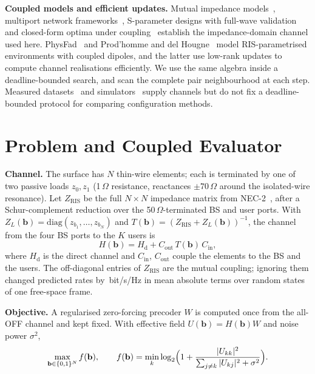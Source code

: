 \documentclass[runningheads]{llncs}
\newcommand{\Hd}{H_{\mathrm{d}}}
\begin{document}
\textbf{Coupled models and efficient updates.} Mutual impedance models~\cite{qian2020mutual}, multiport network frameworks~\cite{nerini2024universal,nossek2024physically}, S-parameter designs with full-wave validation~\cite{abrardo2024design} and closed-form optima under coupling~\cite{nerini2026global} establish the impedance-domain channel used here. PhysFad~\cite{faqiri2023physfad} and Prod'homme and del Hougne~\cite{prodhomme2023efficient} model RIS-parametrised environments with coupled dipoles, and the latter use low-rank updates to compute channel realisations efficiently. We use the same algebra inside a deadline-bounded search, and scan the complete pair neighbourhood at each step. Measured datasets~\cite{tewes2023comprehensive,rossanese2024open,piana2026brisc} and simulators~\cite{burtakov2023qris} supply channels but do not fix a deadline-bounded protocol for comparing configuration methods.

\section{Problem and Coupled Evaluator}\label{sec:problem}
\textbf{Channel.} The surface has $N$ thin-wire elements; each is terminated by one of two passive loads $z_0,z_1$ (1\,$\Omega$ resistance, reactances $\pm70\,\Omega$ around the isolated-wire resonance). Let $Z_{\mathrm{RIS}}$ be the full $N\times N$ impedance matrix from NEC-2~\cite{burke1981nec,pynec}, after a Schur-complement reduction over the 50\,$\Omega$-terminated BS and user ports. With $Z_L(\mathbf b)=\mathrm{diag}(z_{b_1},\dots,z_{b_N})$ and $T(\mathbf b)=(Z_{\mathrm{RIS}}+Z_L(\mathbf b))^{-1}$, the channel from the four BS ports to the $K$ users is
\begin{equation}
H(\mathbf b)=\Hd + C_{\mathrm{out}}\,T(\mathbf b)\,C_{\mathrm{in}},
\label{eq:operator}
\end{equation}
where $\Hd$ is the direct channel and $C_{\mathrm{in}}$, $C_{\mathrm{out}}$ couple the elements to the BS and the users. The off-diagonal entries of $Z_{\mathrm{RIS}}$ are the mutual coupling; ignoring them changed predicted rates by \,bit/s/Hz in mean absolute terms over  random states of one free-space frame.

\textbf{Objective.} A regularised zero-forcing precoder $W$ is computed once from the all-OFF channel and kept fixed. With effective field $U(\mathbf b)=H(\mathbf b)W$ and noise power $\sigma^2$,
\begin{equation}
\max_{\mathbf b\in\{0,1\}^N} f(\mathbf b),\qquad f(\mathbf b)=\min_{k}\log_2\Bigl(1+\frac{|U_{kk}|^2}{\sum_{j\ne k}|U_{kj}|^2+\sigma^2}\Bigr).
\label{eq:objective}
\end{equation}
\end{document}
